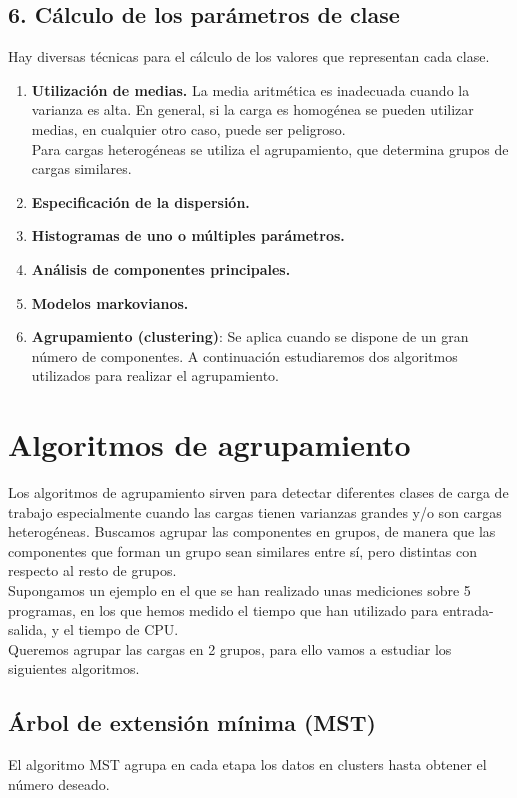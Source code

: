 \subsection{6. Cálculo de los parámetros de clase}
Hay diversas técnicas para el cálculo de los valores que representan cada clase.
\begin{enumerate}
    \item \textbf{Utilización de medias.}
    La media aritmética es inadecuada cuando la varianza es alta. En general, si la carga es homogénea se pueden utilizar medias, en cualquier otro caso, puede ser peligroso.\\
    
    Para cargas heterogéneas se utiliza el agrupamiento, que determina grupos de cargas similares.
    \item \textbf{Especificación de la dispersión.}
    \item \textbf{Histogramas de uno o múltiples parámetros.}
    \item \textbf{Análisis de componentes principales.}
    \item \textbf{Modelos markovianos.}
    \item \textbf{Agrupamiento (clustering)}: Se aplica cuando se dispone de un gran número de componentes. A continuación estudiaremos dos algoritmos utilizados para realizar el agrupamiento.
\end{enumerate}

\section{Algoritmos de agrupamiento}
Los algoritmos de agrupamiento sirven para detectar diferentes clases de carga de trabajo especialmente cuando las cargas tienen varianzas grandes y/o son cargas heterogéneas. Buscamos agrupar las componentes en grupos, de manera que las componentes que forman un grupo sean similares entre sí, pero distintas con respecto al resto de grupos.\\

Supongamos un ejemplo en el que se han realizado unas mediciones sobre 5 programas, en los que hemos medido el tiempo que han utilizado para entrada-salida, y el tiempo de CPU.\\

Queremos agrupar las cargas en 2 grupos, para ello vamos a estudiar los siguientes algoritmos.
\subsection{Árbol de extensión mínima (MST)}
El algoritmo MST agrupa en cada etapa los datos en clusters hasta obtener el número deseado.

